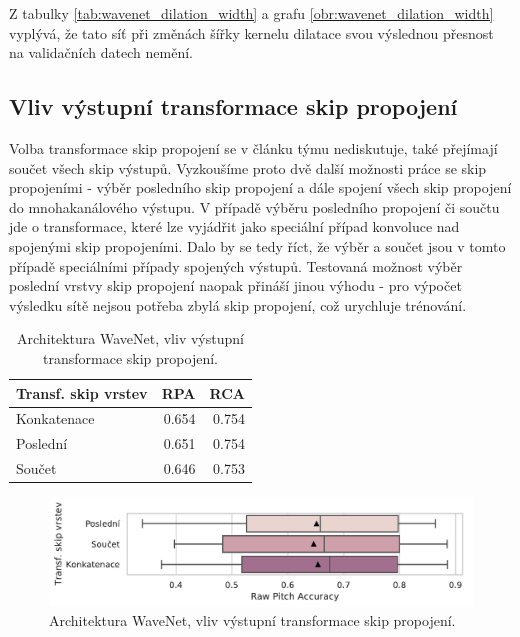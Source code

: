 Z tabulky \ref{tab:wavenet_dilation_width} a grafu \ref{obr:wavenet_dilation_width} vyplývá, že tato síť při změnách šířky kernelu dilatace svou výslednou přesnost na validačních datech nemění.

\subsection{Vliv výstupní transformace skip propojení}

Volba transformace skip propojení se v článku týmu \cite{Oord2016} nediskutuje, \cite{Martak2018} také přejímají součet všech skip výstupů. Vyzkoušíme proto dvě další možnosti práce se skip propojeními - výběr posledního skip propojení a dále spojení všech skip propojení do mnohakanálového výstupu. V případě výběru posledního propojení či součtu jde o transformace, které lze vyjádřit jako speciální případ konvoluce nad spojenými skip propojeními. Dalo by se tedy říct, že výběr a součet jsou v tomto případě speciálními případy spojených výstupů. Testovaná možnost výběr poslední vrstvy skip propojení naopak přináší jinou výhodu - pro výpočet výsledku sítě nejsou potřeba zbylá skip propojení, což urychluje trénování.

\begin{table}[h!]
\centering
    \begin{tabular}{lrr}
    \toprule
    Transf. skip vrstev &   RPA &   RCA \\
    \midrule
            Konkatenace & 0.654 & 0.754 \\
            Poslední & 0.651 & 0.754 \\
                Součet & 0.646 & 0.753 \\
    \bottomrule
    \end{tabular}

\caption{Architektura WaveNet, vliv výstupní transformace skip propojení.}\label{tab:wavenet_skip_reduction}
\end{table}

\begin{figure}[h]\centering
    \includegraphics[scale=0.6]{../img/figures/wavenet_skip_reduction.pdf}
\caption{Architektura WaveNet, vliv výstupní transformace skip propojení.}\label{obr:wavenet_skip_reduction}
\end{figure}

